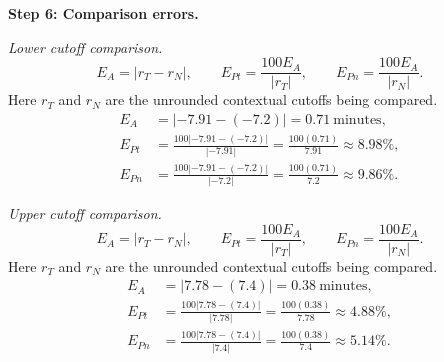 \begin{enumerate}[leftmargin=*,label=\textbf{\arabic*.},itemsep=12pt,parsep=3pt,topsep=5pt]
\begin{minipage}{\linewidth}
\end{minipage}\par
\par\textbf{Step 6: Comparison errors.}\nopagebreak\enspace \par\noindent\begin{minipage}{\linewidth}
\par\textit{Lower cutoff comparison.}
\[
E_A=|r_T-r_N|,\qquad E_{Pt}=\frac{100E_A}{|r_T|},\qquad E_{Pn}=\frac{100E_A}{|r_N|}.
\]
Here $r_T$ and $r_N$ are the unrounded contextual cutoffs being compared.
\[
\begin{aligned}
E_A&=|-7.91-(-7.2)|=0.71\ \text{minutes},\\
E_{Pt}&=\frac{100|-7.91-(-7.2)|}{|-7.91|}=\frac{100(0.71)}{7.91}\approx 8.98\%,\\
E_{Pn}&=\frac{100|-7.91-(-7.2)|}{|-7.2|}=\frac{100(0.71)}{7.2}\approx 9.86\%.
\end{aligned}
\]
\end{minipage}\par
\par\noindent\begin{minipage}{\linewidth}
\par\textit{Upper cutoff comparison.}
\[
E_A=|r_T-r_N|,\qquad E_{Pt}=\frac{100E_A}{|r_T|},\qquad E_{Pn}=\frac{100E_A}{|r_N|}.
\]
Here $r_T$ and $r_N$ are the unrounded contextual cutoffs being compared.
\[
\begin{aligned}
E_A&=|7.78-(7.4)|=0.38\ \text{minutes},\\
E_{Pt}&=\frac{100|7.78-(7.4)|}{|7.78|}=\frac{100(0.38)}{7.78}\approx 4.88\%,\\
E_{Pn}&=\frac{100|7.78-(7.4)|}{|7.4|}=\frac{100(0.38)}{7.4}\approx 5.14\%.
\end{aligned}
\]
\end{minipage}\par


\end{enumerate}
